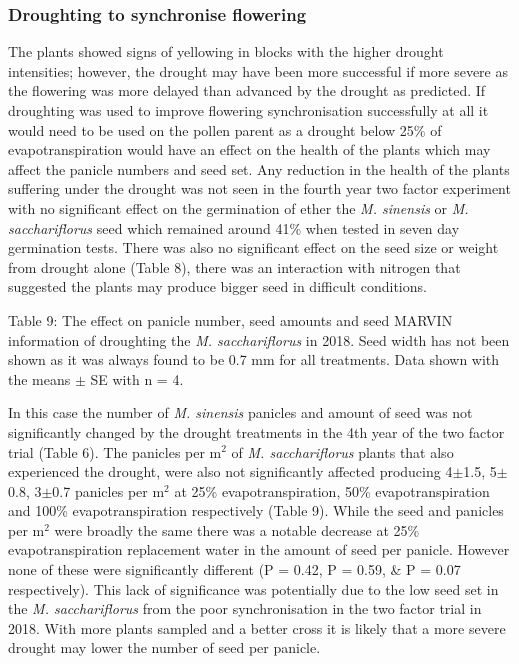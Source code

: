 \documentclass[fleqn, 15pt, lineno]{olplainarticle}
\begin{document}
\subsubsection{Droughting to synchronise flowering}
The plants showed signs of yellowing in blocks with the higher drought intensities; however, the drought may have been more successful if more severe as the flowering was more delayed than advanced by the drought as predicted.
If droughting was used to improve flowering synchronisation successfully at all it would need to be used on the pollen parent as a drought below 25\% of evapotranspiration would have an effect on the health of the plants which may affect the panicle numbers and seed set.
Any reduction in the health of the plants suffering under the drought was not seen in the fourth year two factor experiment with no significant effect on the germination of ether the \textit{M. sinensis} or \textit{M. sacchariflorus} seed which remained around 41\% when tested in seven day germination tests.
There was also no significant effect on the seed size or weight from drought alone (Table 8), there was an interaction with nitrogen that suggested the plants may produce bigger seed in difficult conditions.

Table 9: The effect on panicle number, seed amounts and seed MARVIN information of droughting the \textit{M. sacchariflorus} in 2018.
Seed width has not been shown as it was always found to be 0.7 mm for all treatments.
Data shown with the means $\pm$ SE with n = 4.
 

In this case the number of \textit{M. sinensis} panicles and amount of seed was not significantly changed by the drought treatments in the 4th year of the two factor trial (Table 6).
The panicles per m$^2$ of \textit{M. sacchariflorus} plants that also experienced the drought, were also not significantly affected producing 4$\pm$1.5, 5$\pm$0.8, 3$\pm$0.7 panicles per m$^2$ at 25\% evapotranspiration, 50\% evapotranspiration and 100\% evapotranspiration respectively (Table 9).
While the seed and panicles per m$^2$ were broadly the same there was a notable decrease at 25\% evapotranspiration replacement water in the amount of seed per panicle.
However none of these were significantly different (P = 0.42, P = 0.59, \& P = 0.07 respectively).
This lack of significance was potentially due to the low seed set in the \textit{M. sacchariflorus} from the poor synchronisation in the two factor trial in 2018.
With more plants sampled and a better cross it is likely that a more severe drought may lower the number of seed per panicle.
\end{document}
